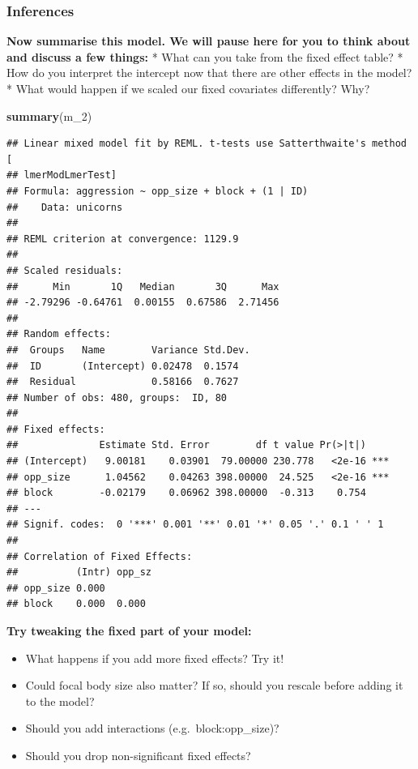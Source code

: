 \documentclass[
  12pt,
]{book}
\makeatletter
\newenvironment{Shaded}{\begin{snugshade}}{\end{snugshade}}
\newcommand{\DecValTok}[1]{\textcolor[rgb]{0.00,0.00,0.81}{#1}}
\newcommand{\KeywordTok}[1]{\textcolor[rgb]{0.13,0.29,0.53}{\textbf{#1}}}
\newcommand{\NormalTok}[1]{#1}
\providecommand{\tightlist}{%
  \setlength{\itemsep}{0pt}\setlength{\parskip}{0pt}}
\newenvironment{kframe}{%
\medskip{}
\setlength{\fboxsep}{.8em}
\def\at@end@of@kframe{}%
\ifinner\ifhmode%
 \def\at@end@of@kframe{\end{minipage}}%
 \begin{minipage}{\columnwidth}%
\fi\fi%
\def\FrameCommand##1{\hskip\@totalleftmargin \hskip-\fboxsep
\colorbox{incolor}{##1}\hskip-\fboxsep
    \hskip-\linewidth \hskip-\@totalleftmargin \hskip\columnwidth}%
\MakeFramed {\advance\hsize-\width
  \@totalleftmargin\z@ \linewidth\hsize
  \@setminipage}}%
{\par\unskip\endMakeFramed%
\at@end@of@kframe}
\newenvironment{rmdblock}[1]
 {
 \begin{itemize}
 \renewcommand{\labelitemi}{
   \raisebox{-.7\height}[0pt][0pt]{
     {\setkeys{Gin}{width=3em,keepaspectratio}\texttt{[image: images/icons/\#1]}}
   }
 }
 \begin{kframe}
 \setlength{\fboxsep}{1em}
 \item
 }
 {
 \end{kframe}
 \end{itemize}
 }
\newenvironment{rmdcode}
  {\begin{rmdblock}{code}}
  {\end{rmdblock}}
\makeatother
\begin{document}
\hypertarget{inferences}{%
\subsubsection{Inferences}\label{inferences}}

\textbf{Now summarise this model. We will pause here for you to think about and discuss a few things:}
* What can you take from the fixed effect table?
* How do you interpret the intercept now that there are other effects in the model?
* What would happen if we scaled our fixed covariates differently? Why?

\begin{Shaded}
\begin{Highlighting}[]
\KeywordTok{summary}\NormalTok{(m\_}\DecValTok{2}\NormalTok{)}
\end{Highlighting}
\end{Shaded}

\begin{verbatim}
## Linear mixed model fit by REML. t-tests use Satterthwaite's method [
## lmerModLmerTest]
## Formula: aggression ~ opp_size + block + (1 | ID)
##    Data: unicorns
## 
## REML criterion at convergence: 1129.9
## 
## Scaled residuals: 
##      Min       1Q   Median       3Q      Max 
## -2.79296 -0.64761  0.00155  0.67586  2.71456 
## 
## Random effects:
##  Groups   Name        Variance Std.Dev.
##  ID       (Intercept) 0.02478  0.1574  
##  Residual             0.58166  0.7627  
## Number of obs: 480, groups:  ID, 80
## 
## Fixed effects:
##              Estimate Std. Error        df t value Pr(>|t|)    
## (Intercept)   9.00181    0.03901  79.00000 230.778   <2e-16 ***
## opp_size      1.04562    0.04263 398.00000  24.525   <2e-16 ***
## block        -0.02179    0.06962 398.00000  -0.313    0.754    
## ---
## Signif. codes:  0 '***' 0.001 '**' 0.01 '*' 0.05 '.' 0.1 ' ' 1
## 
## Correlation of Fixed Effects:
##          (Intr) opp_sz
## opp_size 0.000        
## block    0.000  0.000
\end{verbatim}

\begin{rmdcode}
\textbf{Try tweaking the fixed part of your model:}

\begin{itemize}
\tightlist
\item
  What happens if you add more fixed effects? Try it!
\item
  Could focal body size also matter? If so, should you rescale before adding it to the model?
\item
  Should you add interactions (e.g.~block:opp\_size)?
\item
  Should you drop non-significant fixed effects?
\end{itemize}
\end{rmdcode}
\end{document}
